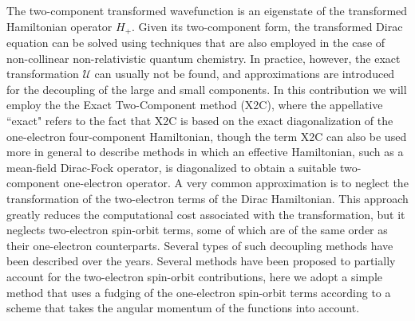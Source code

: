\documentclass[12pt]{article}
\begin{document}
The two-component transformed wavefunction is an eigenstate of the transformed Hamiltonian operator ${H}_+$.
Given its two-component form, the transformed Dirac equation can be solved using techniques that are also employed in the case of non-collinear non-relativistic quantum chemistry.\cite{Liu04_6658,Liu05_241102,Liu03_597,Liu05_054102}
In practice, however, the exact transformation $\mathcal{U}$ can usually not be found, and approximations are introduced for the decoupling of the large and small components.
In this contribution we will employ the the Exact Two-Component method (X2C), where the appellative ``exact" refers to the fact that X2C is based on the exact diagonalization of the one-electron four-component Hamiltonian,\cite{Liu05_241102,Peng06_044102,Saue07_064102,Peng09_031104,Reiher13_184105,Cheng07_104106} though the term X2C can also be used more in general to describe methods in which an effective Hamiltonian, such as a mean-field Dirac-Fock operator, is diagonalized to obtain a suitable two-component one-electron operator.\cite{Reiher13_184105,Saue11_3077,Liu10_1679,Liu14_59}
A very common approximation is to neglect the transformation of the two-electron terms of the Dirac Hamiltonian.
This approach greatly reduces the computational cost associated with the transformation, but it neglects two-electron spin-orbit terms, some of which are of the same order as their one-electron counterparts.
Several types of such decoupling methods have been described over the years.
Several methods have been proposed to partially account for the two-electron spin-orbit contributions,\cite{Gropen96_365,Cremer13_014106,Cheng07_104106,Peng06_044102}
here we adopt a simple method that uses a fudging of the one-electron spin-orbit terms according to a scheme that takes the angular momentum of the functions into account.\cite{Boettger00_7809,Neese04_book541}



\end{document}
